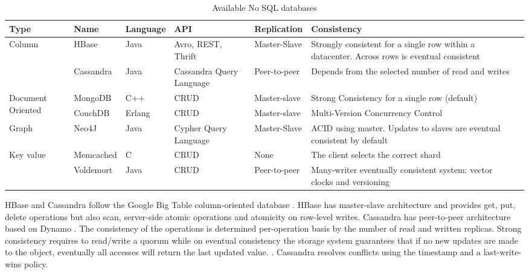\setlength\LTleft{-1in}
\setlength\LTright{-1in}
\begin{center}
\begin{table}[ht]
\small
\hspace*{-1cm}
\begin{tabular}{|p{1.5cm}|p{1.8cm}|p{1.6cm}|p{1.8cm}|p{1.7cm}|p{2cm}|p{3.5cm}|}
\hline
\textbf{Type}  & \textbf{Name} & \textbf{Language} & \textbf{API} & \textbf{Replication}  & \textbf{Consistency} \\ \hline

\multirow{2}{*}{Column} 
	& HBase 		& Java  & Avro, REST, Thrift & Master-Slave & Strongly consistent for a single row within a datacenter. Across rows is eventual consistent \\ \cline{2-7}
	& Cassandra 	& Java  & Cassandra Query \newline Language & Peer-to-peer  & Depends from the selected number of read and writes \\ \hline

\multirow{2}{1.5cm}{Document Oriented} 
	& MongoDB  	& C++  		& \acs{CRUD}  	& Master-slave & Strong Consistency for a single row (default) \\ \cline{2-7} 
	& CouchDB 	& Erlang   	& \acs{CRUD} 	& Master-slave & Multi-Version Concurrency Control \\ \hline

Graph 
	& Neo4J 	& Java  	& Cypher Query \newline Language  & Master-Slave & ACID using master. Updates to slaves are eventual consistent by default \\ \hline


\multirow{2}{1.5cm}{Key value}         
	& Memcached   	& C  		& \acs{CRUD}  	& None 			& The client selects the correct shard \\ \cline{2-7} 
	& Voldemort  	& Java		& \acs{CRUD} 	& Peer-to-peer 		& Many-writer eventually consistent system: vector clocks and versioning  \\ \hline
\end{tabular}
\caption{Available No \ac{SQL} databases}
\label{tab:no_sql_databases}
\end{table}
\end{center}

HBase and Cassandra follow the Google Big Table column-oriented database \cite{Chang2008}. HBase has master-slave architecture and provides get, put, delete operations but also scan, server-side atomic operations and atomicity on row-level writes. Cassandra has peer-to-peer architecture based on Dynamo \cite{Decandia2007}. The consistency of the operations is determined per-operation basis by the number of read and written replicas. Strong consistency requires to read/write a quorum while on eventual consistency the storage system guarantees that if no new updates are made to the object, eventually all accesses will return the last updated value. \cite{Decandia2007}. Cassandra resolves conflicts using the timestamp and a last-write-wins policy. 


